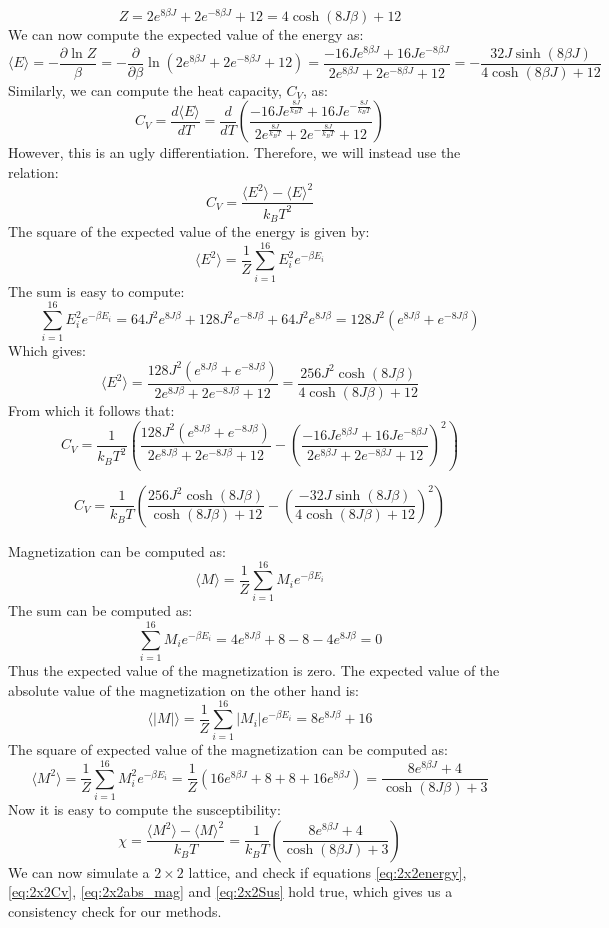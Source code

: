 \documentclass[a4paper, 10pt]{article}
\begin{document}
$$Z=2e^{8\beta J}+2e^{-8\beta J} + 12=4\cosh (8J\beta) +12$$
We can now compute the expected value of the energy as:
\begin{equation}\label{eq:2x2energy}
\langle E \rangle =  -\frac{\partial \ln Z}{\beta}=-\frac{\partial}{\partial \beta}\ln\left(2e^{8\beta J}+2e^{-8\beta J}+12\right)=\frac{-16Je^{8\beta J}+16Je^{-8\beta J}}{2e^{8\beta J}+2e^{-8\beta J}+12}=-\frac{32J\sinh(8\beta J)}{4\cosh(8\beta J)+12}
\end{equation}
Similarly, we can compute the heat capacity, $C_V$, as:
$$C_V=\frac{d\langle E \rangle}{dT}=\frac{d}{dT}\left(\frac{-16Je^{\frac{8J}{k_BT}}+16Je^{-\frac{8J}{k_BT}}}{2e^{\frac{8J}{k_BT}}+2e^{-\frac{8J}{k_BT}}+12}\right)$$
However, this is an ugly differentiation. Therefore, we will instead use the relation:
$$C_V=\frac{\langle E^2 \rangle - \langle E \rangle^2}{k_BT^2}$$
The square of the expected value of the energy is given by:
$$\langle E^2\rangle=\frac{1}{Z} \sum_{i=1}^ {16}E_i^2e^{-\beta E_i}$$
The sum is easy to compute:
$$\sum_{i=1}^{16}E_i^2e^{-\beta E_i}=64J^2e^{8J\beta}+128J^2e^{-8J\beta}+64J^2e^{8J\beta}=128J^2\left(e^{8J\beta}+e^{-8J\beta}\right)$$
Which gives:
$$\langle E^2\rangle = \frac{128J^2\left(e^{8J\beta}+e^{-8J\beta}\right)}{2e^{8J\beta}+2e^{-8J\beta}+12}=\frac{256J^2\cosh(8J\beta)}{4\cosh(8J\beta)+12}$$
From which it follows that:
$$C_V=\frac{1}{k_BT^2}\left(\frac{128J^2\left(e^{8J\beta}+e^{-8J\beta}\right)}{2e^{8J\beta}+2e^{-8J\beta}+12}-\left(\frac{-16Je^{8\beta J}+16Je^{-8\beta J}}{2e^{8\beta J}+2e^{-8\beta J}+12}\right)^2\right)$$

\begin{equation}\label{eq:2x2Cv}
C_V=\frac{1}{k_BT}\left(\frac{256J^2\cosh(8J\beta)}{\cosh(8J\beta)+12}-\left(\frac{-32J\sinh(8J\beta)}{4\cosh(8J\beta)+12}\right)^2\right)
\end{equation}

Magnetization can be computed as:
$$\langle M \rangle=\frac{1}{Z}\sum_{i=1}^{16}M_ie^{-\beta E_i}$$
The sum can be computed as:
$$\sum_{i=1}^{16}M_ie^{-\beta E_i}=4e^{8J\beta}+8-8-4e^{8J\beta}=0$$
Thus the expected value of the magnetization is zero. The expected value of the absolute value of the magnetization on the other hand is:
\begin{equation}\label{eq:2x2abs_mag}
\langle |M|\rangle =\frac{1}{Z}\sum_{i=1}^{16}|M_i|e^{-\beta E_i}=8e^{8J\beta}+16
\end{equation}
The square of expected value of the magnetization can be computed as:
$$\langle M^2 \rangle = \frac{1}{Z}\sum_{i=1}^{16}M_i^2e^{-\beta E_i}=\frac{1}{Z}\left(16e^{8\beta J}+8+8+16e^{8\beta J}\right)=\frac{8e^{8\beta J}+4}{\cosh(8J\beta)+3}$$
Now it is easy to compute the susceptibility:
\begin{equation}\label{eq:2x2Sus}
\chi = \frac{\langle M^2\rangle - \langle M \rangle^2}{k_BT}=\frac{1}{k_BT}\left(\frac{8e^{8\beta J}+4}{\cosh(8\beta J)+3}\right)
\end{equation}
We can now simulate a $2\times 2$ lattice, and check if equations \ref{eq:2x2energy}, \ref{eq:2x2Cv}, \ref{eq:2x2abs_mag} and \ref{eq:2x2Sus} hold true, which gives us a consistency check for our methods.
\end{document}
